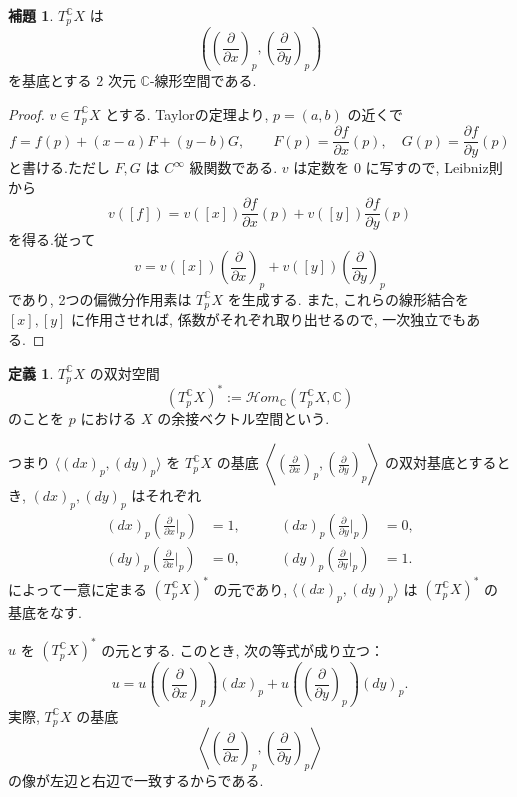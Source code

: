 \documentclass[dvipdfmx,a4paper,11pt]{article} %
\newcommand{\C}{\mathbb{C}}
\theoremstyle{definition}
\numberwithin{equation}{section}
\newtheorem{lem}[thm]{補題}
\newtheorem{dfn}[thm]{定義}
\newcommand{\OSourceHom}{\mathscr{H}\!\textit{om}}
\begin{document}
\begin{lem}\label{O-M079}
$T_{p}^{\C}X$ は
\[
\left(\left(\frac{\partial}{\partial x}\right)_p,\left(\frac{\partial}{\partial y}\right)_p\right)
\]
を基底とする $2$ 次元 $\C{}$-線形空間である.
\end{lem}
\begin{proof}
$v\in T_{p}^{\C}X$ とする.
Taylorの定理より, $p=(a,b)$ の近くで
\[
f=f(p)+(x-a)F+(y-b)G,
\qquad F(p)=\frac{\partial f}{\partial x}(p),\quad G(p)=\frac{\partial f}{\partial y}(p)
\]
と書ける.ただし $F,G$ は $C^\infty$ 級関数である.
$v$ は定数を $0$ に写すので, Leibniz則から
\[
v([f])=v([x])\frac{\partial f}{\partial x}(p)+v([y])\frac{\partial f}{\partial y}(p)
\]
を得る.従って
\[
v=v([x])\left(\frac{\partial}{\partial x}\right)_p
 +v([y])\left(\frac{\partial}{\partial y}\right)_p
\]
であり, 2つの偏微分作用素は $T_{p}^{\C}X$ を生成する.
また, これらの線形結合を $[x],[y]$ に作用させれば, 
係数がそれぞれ取り出せるので, 一次独立でもある.
\end{proof}





\begin{dfn}\label{O-M081}
$T_{p}^{\C}X$ の双対空間
\[
(T_{p}^{\C}X)^*:=\OSourceHom_{\C{}}(T_{p}^{\C}X,\C{})
\]
のことを $p$ における $X$ の余接ベクトル空間という.

つまり
$\langle (dx)_p,(dy)_p\rangle$ を $T_{p}^{\C}X$ の基底
\(
\left\langle \left(\frac{\partial}{\partial x}\right)_p,\left(\frac{\partial}{\partial y}\right)_p\right\rangle
\)
の双対基底とするとき, $(dx)_p,(dy)_p$ はそれぞれ
\[
\begin{aligned}
(dx)_p\left(\frac{\partial}{\partial x}\Big|_p\right)&=1,
&\qquad
(dx)_p\left(\frac{\partial}{\partial y}\Big|_p\right)&=0,\\
(dy)_p\left(\frac{\partial}{\partial x}\Big|_p\right)&=0,
&\qquad
(dy)_p\left(\frac{\partial}{\partial y}\Big|_p\right)&=1.
\end{aligned}
\]
によって一意に定まる $(T_{p}^{\C}X)^*$ の元であり, $\langle (dx)_p,(dy)_p\rangle$ は $(T_{p}^{\C}X)^*$ の基底をなす.
\end{dfn}

$u$ を $(T_{p}^{\C}X)^*$ の元とする. このとき, 次の等式が成り立つ：
\[
u=
u\left(\left(\frac{\partial}{\partial x}\right)_p\right)(dx)_p+
u\left(\left(\frac{\partial}{\partial y}\right)_p\right)(dy)_p.
\]
実際, $T_{p}^{\C}X$ の基底
\[
\left\langle \left(\frac{\partial}{\partial x}\right)_p,\left(\frac{\partial}{\partial y}\right)_p\right\rangle
\]
の像が左辺と右辺で一致するからである.
\end{document}
